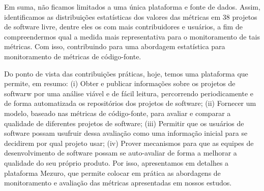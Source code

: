 \documentclass{llncs}
\begin{document}
Em suma, não ficamos limitados a uma única plataforma e fonte de dados. Assim,
identificamos as distribuições estatísticas dos valores das métricas em 38
projetos de software livre, dentre eles os com mais contribuidores e usuários,
a fim de compreendermos qual a medida mais representativa para o monitoramento
de tais métricas.
%
Com isso, contribuindo para uma abordagem estatística para monitoramento de
métricas de código-fonte.

Do ponto de vista das contribuições práticas, hoje, temos uma plataforma que
permite, em resumo: 
% 
(i) Obter e publicar informações sobre os projetos de softwarw por uma análise
viável e de fácil leitura, percorrendo periodicamente e de forma automatizada
os repositórios dos projetos de software; 
% 
(ii) Fornecer um modelo, baseado nas métricas de código-fonte, para avaliar e
comparar a qualidade de diferentes projetos de software; 
% 
(iii) Permitir que os usuários de software possam usufruir dessa avaliação como
uma informação inicial para se decidirem por qual projeto usar; 
%
(iv) Prover mecanismos para que as equipes de desenvolvimento de software
possam se auto-avaliar de forma a melhorar a qualidade do seu próprio produto. 
%
Por isso, apresentamos em detalhes a plataforma Mezuro, que permite colocar em
prática as abordagens de monitoramento e avaliação das métricas apresentadas em
nossos estudos.



\end{document}
